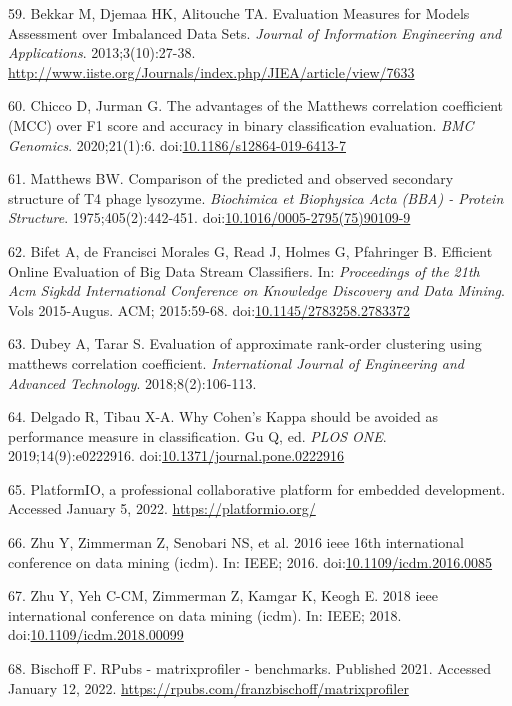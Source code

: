 \documentclass[12pt,twoside]{fmupthesis}
\begin{document}
\leavevmode\hypertarget{ref-Bekkar2013}{}%
59. Bekkar M, Djemaa HK, Alitouche TA. Evaluation Measures for Models Assessment over Imbalanced Data Sets. \emph{Journal of Information Engineering and Applications}. 2013;3(10):27-38. \url{http://www.iiste.org/Journals/index.php/JIEA/article/view/7633}

\leavevmode\hypertarget{ref-Chicco2020}{}%
60. Chicco D, Jurman G. The advantages of the Matthews correlation coefficient (MCC) over F1 score and accuracy in binary classification evaluation. \emph{BMC Genomics}. 2020;21(1):6. doi:\href{https://doi.org/10.1186/s12864-019-6413-7}{10.1186/s12864-019-6413-7}

\leavevmode\hypertarget{ref-Matthews1975}{}%
61. Matthews BW. Comparison of the predicted and observed secondary structure of T4 phage lysozyme. \emph{Biochimica et Biophysica Acta (BBA) - Protein Structure}. 1975;405(2):442-451. doi:\href{https://doi.org/10.1016/0005-2795(75)90109-9}{10.1016/0005-2795(75)90109-9}

\leavevmode\hypertarget{ref-Bifet2015}{}%
62. Bifet A, de Francisci Morales G, Read J, Holmes G, Pfahringer B. Efficient Online Evaluation of Big Data Stream Classifiers. In: \emph{Proceedings of the 21th Acm Sigkdd International Conference on Knowledge Discovery and Data Mining}. Vols 2015-Augus. ACM; 2015:59-68. doi:\href{https://doi.org/10.1145/2783258.2783372}{10.1145/2783258.2783372}

\leavevmode\hypertarget{ref-Dubey2018}{}%
63. Dubey A, Tarar S. Evaluation of approximate rank-order clustering using matthews correlation coefficient. \emph{International Journal of Engineering and Advanced Technology}. 2018;8(2):106-113.

\leavevmode\hypertarget{ref-Delgado2019}{}%
64. Delgado R, Tibau X-A. Why Cohen's Kappa should be avoided as performance measure in classification. Gu Q, ed. \emph{PLOS ONE}. 2019;14(9):e0222916. doi:\href{https://doi.org/10.1371/journal.pone.0222916}{10.1371/journal.pone.0222916}

\leavevmode\hypertarget{ref-PlatformIO}{}%
65. PlatformIO, a professional collaborative platform for embedded development. Accessed January 5, 2022. \url{https://platformio.org/}

\leavevmode\hypertarget{ref-zhu2016}{}%
66. Zhu Y, Zimmerman Z, Senobari NS, et al. 2016 ieee 16th international conference on data mining (icdm). In: IEEE; 2016. doi:\href{https://doi.org/10.1109/icdm.2016.0085}{10.1109/icdm.2016.0085}

\leavevmode\hypertarget{ref-zhu2018}{}%
67. Zhu Y, Yeh C-CM, Zimmerman Z, Kamgar K, Keogh E. 2018 ieee international conference on data mining (icdm). In: IEEE; 2018. doi:\href{https://doi.org/10.1109/icdm.2018.00099}{10.1109/icdm.2018.00099}

\leavevmode\hypertarget{ref-Bischoff2021a}{}%
68. Bischoff F. RPubs - matrixprofiler - benchmarks. Published 2021. Accessed January 12, 2022. \url{https://rpubs.com/franzbischoff/matrixprofiler}


\end{document}
